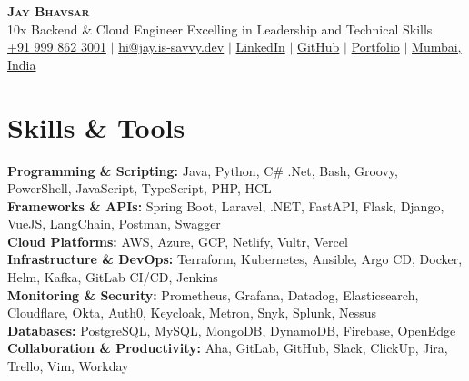 \documentclass[letterpaper,11pt]{article}
\newcommand{\resumeSubHeadingListStart}{\begin{itemize}[leftmargin=0.15in, label={}]}
\newcommand{\resumeSubHeadingListEnd}{\end{itemize}}
\begin{document}

\begin{center}
  \textbf{\Huge \scshape Jay Bhavsar} \\ \vspace{3pt}
  \normalsize 10x Backend \& Cloud Engineer Excelling in Leadership and Technical Skills \\ \vspace{3pt}
  \small
  \faMobile \hspace{.5pt} \href{tel:919998623001}{+91 999 862 3001}
  $|$
  \faAt \hspace{.5pt} \href{mailto:hi@jay.is-savvy.dev}{hi@jay.is-savvy.dev}
  $|$
  \faLinkedinSquare \hspace{.5pt} \href{https://www.linkedin.com/in/jbhv12/}{LinkedIn}
  $|$
  \faGithub \hspace{.5pt} \href{https://github.com/jbhv12}{GitHub}
  $|$
  \faGlobe \hspace{.5pt} \href{https://jay.is-savvy.dev/}{Portfolio}
  $|$
  \faMapMarker \hspace{.5pt} \href{https://goo.gl/maps/Czh1vXePukiKumpu5}{Mumbai, India}
\end{center}


\section{Skills \& Tools}
\vspace{2pt}
\resumeSubHeadingListStart
\small{\item{
              \textbf{Programming \& Scripting:}{ Java, Python, C\# .Net, Bash, Groovy, PowerShell, JavaScript, TypeScript, PHP, HCL} \\ \vspace{3pt}
              \textbf{Frameworks \& APIs:}{ Spring Boot, Laravel, .NET, FastAPI, Flask, Django, VueJS, LangChain, Postman, Swagger} \\ \vspace{3pt}
              \textbf{Cloud Platforms:}{ AWS, Azure, GCP, Netlify, Vultr, Vercel} \\ \vspace{3pt}
              \textbf{Infrastructure \& DevOps:}{ Terraform, Kubernetes, Ansible, Argo CD, Docker, Helm, Kafka, GitLab CI/CD, Jenkins} \\ \vspace{3pt}
              \textbf{Monitoring \& Security:}{ Prometheus, Grafana, Datadog, Elasticsearch, Cloudflare, Okta, Auth0, Keycloak, Metron, Snyk, Splunk, Nessus} \\ \vspace{3pt}
              \textbf{Databases:}{ PostgreSQL, MySQL, MongoDB, DynamoDB, Firebase, OpenEdge} \\ \vspace{3pt}
              \textbf{Collaboration \& Productivity:}{ Aha, GitLab, GitHub, Slack, ClickUp, Jira, Trello, Vim, Workday} \\ \vspace{3pt}
            }}
\resumeSubHeadingListEnd
\end{document}

